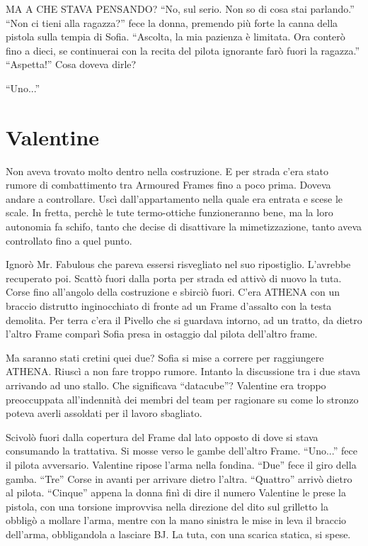     MA A CHE STAVA PENSANDO? ``No, sul serio. Non so di cosa stai parlando.'' ``Non ci tieni alla ragazza?'' fece la
    donna, premendo più forte la canna della pistola sulla tempia di Sofia. ``Ascolta, la mia pazienza è limitata. Ora
    conterò fino a dieci, se continuerai con la recita del pilota ignorante farò fuori la ragazza.'' ``Aspetta!'' Cosa
    doveva dirle?

    ``Uno...''

  \section*{Valentine}

    Non aveva trovato molto dentro nella costruzione. E per strada c'era stato rumore di combattimento tra Armoured
    Frames fino a poco prima. Doveva andare a controllare. Uscì dall'appartamento nella quale era entrata e scese le
    scale. In fretta, perchè le tute termo-ottiche funzioneranno bene, ma la loro autonomia fa schifo, tanto che decise
    di disattivare la mimetizzazione, tanto aveva controllato fino a quel punto.

    Ignorò Mr. Fabulous che pareva essersi risvegliato nel suo ripostiglio. L'avrebbe recuperato poi. Scattò fuori dalla
    porta per strada ed attivò di nuovo la tuta. Corse fino all'angolo della costruzione e sbirciò fuori. C'era ATHENA
    con un braccio distrutto inginocchiato di fronte ad un Frame d'assalto con la testa demolita. Per terra c'era il
    Pivello che si guardava intorno, ad un tratto, da dietro l'altro Frame comparì Sofia presa in ostaggio dal pilota
    dell'altro frame.

    Ma saranno stati cretini quei due? Sofia si mise a correre per raggiungere ATHENA. Riuscì a non fare troppo rumore.
    Intanto la discussione tra i due stava arrivando ad uno stallo. Che significava ``datacube''? Valentine era troppo
    preoccuppata all'indennità dei membri del team per ragionare su come lo stronzo poteva averli assoldati per il
    lavoro sbagliato.

    Scivolò fuori dalla copertura del Frame dal lato opposto di dove si stava consumando la trattativa. Si mosse verso
    le gambe dell'altro Frame. ``Uno...'' fece il pilota avversario. Valentine ripose l'arma nella fondina. ``Due'' fece il giro
    della gamba. ``Tre'' Corse in avanti per arrivare dietro l'altra. ``Quattro'' arrivò dietro al pilota. ``Cinque''
    appena la donna finì di dire il numero Valentine le prese la pistola, con una torsione improvvisa nella direzione
    del dito sul grilletto la obbligò a mollare l'arma, mentre con la mano sinistra le mise in leva il braccio
    dell'arma, obbligandola a lasciare BJ. La tuta, con una scarica statica, si spese.

